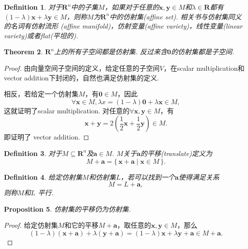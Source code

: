 \documentclass{article}
\newtheorem{theorem}{Theorem}[section]
\newtheorem{proposition}[theorem]{Proposition}
\newtheorem{definition}[theorem]{Definition}
\newcommand\Set[2]{\{\,#1\mid#2\,\}} %
\newcommand{\vect}[1]{\mathbf{#1}} %
\newcommand{\thereal}{\mathbf{R}} %
\begin{document}
\begin{definition}
\rm 对于$\thereal^n$中的子集$M$，如果对于任意的$\vect{x},\vect{y} \in M$和$\lambda \in \thereal$都有$(1-\lambda)\vect{x} + \lambda\vect{y} \in M$，则称$M$为$\thereal^n$中的{\color{red}仿射集}(affine set). 相关书与仿射集同义的名词有{\color{red}仿射流形
}(affine manifold)，{\color{red}仿射变量}(affine variety)，{\color{red}线性变量}(linear variety)或者{\color{red}flat}(平坦的).
\end{definition}

\begin{theorem}
\rm $\thereal^n$上的所有子空间都是仿射集. 反过来含$\vect{0}$的仿射集都是子空间.
\end{theorem}

\begin{proof}
\rm 由向量空间子空间的定义，给定任意的子空间$V$，在{\color{red}scalar multiplication}和{\color{red} vector addition}下封闭的，自然也满足仿射集的定义. 

相反，若给定一个仿射集$M$，有$\vect{0} \in M$，因此
$$
\forall \vect{x} \in M, \lambda x = (1-\lambda)\vect{0} + \lambda \vect{x} \in M,
$$
这就证明了{\color{red}scalar multiplication}. 对任意的$\forall \vect{x},\vect{y} \in M$，有
$$
\vect{x}+\vect{y} = 2(\frac{1}{2} \vect{x} + \frac{1}{2} \vect{y}) \in M.
$$
即证明了{\color{red} vector addition}.
\end{proof}

\begin{definition}
\rm 对于$M \subseteq \thereal^n$及$\vect{a} \in M$. $M$关于$\vect{a}$的{\color{red}平移}(translate)定义为
$$
M + \vect{a} = \Set{\vect{x}+\vect{a}}{\vect{x} \in M}.
$$
\end{definition}

\begin{definition}
\rm 给定仿射集$M$和仿射集$L$，若可以找到一个$\vect{a}$使得满足关系
$$
M = L + \vect{a},
$$
则称$M$和$L$ {\color{red}平行}.
\end{definition}

\begin{proposition}
\rm 仿射集的平移仍为仿射集.
\end{proposition}

\begin{proof}
给定仿射集$M$和它的平移$M + \vect{a}$，取任意的$\vect{x},\vect{y} \in M$，那么
$$
(1-\lambda)(\vect{x} + \vect{a})+\lambda(\vect{y}+\vect{a}) = (1-\lambda)\vect{x} + \lambda\vect{y} + \vect{a} \in  M + \vect{a}.
$$
\end{proof}
\end{document}
